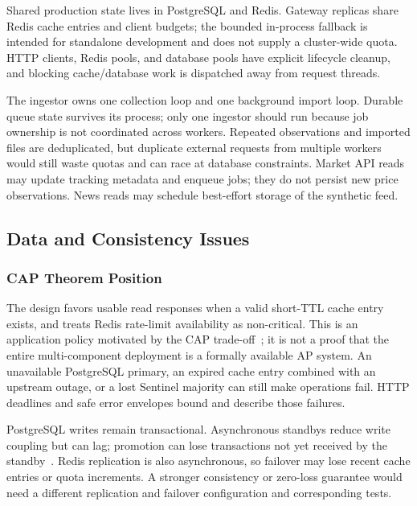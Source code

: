\documentclass{scrartcl}
\begin{document}
Shared production state lives in PostgreSQL and Redis. Gateway replicas share Redis cache
entries and client budgets; the bounded in-process fallback is intended for standalone development
and does not supply a cluster-wide quota. HTTP clients, Redis pools, and database pools have
explicit lifecycle cleanup, and blocking cache/database work is dispatched away from request threads.

The ingestor owns one collection loop and one background import loop. Durable queue state survives
its process; only one ingestor should run because job ownership is not coordinated across workers.
Repeated observations and imported files are deduplicated, but duplicate external requests from
multiple workers would still waste quotas and can race at database constraints. Market API reads
may update tracking metadata and enqueue jobs; they do not persist new price observations.
News reads may schedule best-effort storage of the synthetic feed.

\subsection{Data and Consistency Issues}\label{data-and-consistency-issues}

\subsubsection{CAP Theorem Position}\label{cap-theorem-position}

The design favors usable read responses when a valid short-TTL cache entry exists, and treats
Redis rate-limit availability as non-critical. This is an application policy motivated by the
CAP trade-off~\citep{brewer2000towards,gilbert2002brewer}; it is not a proof that the entire
multi-component deployment is a formally available AP system. An unavailable PostgreSQL primary,
an expired cache entry combined with an upstream outage, or a lost Sentinel majority can still
make operations fail. HTTP deadlines and safe error envelopes bound and describe those failures.

PostgreSQL writes remain transactional. Asynchronous standbys reduce write coupling but can lag;
promotion can lose transactions not yet received by the standby~\citep{postgresql2024docs}. Redis
replication is also asynchronous, so failover may lose recent cache entries or quota increments.
A stronger consistency or zero-loss guarantee would need a different replication and failover
configuration and corresponding tests.
\end{document}
